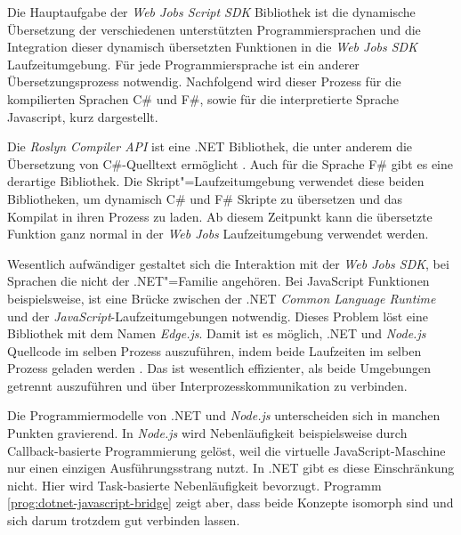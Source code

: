 Die Hauptaufgabe der \textit{Web Jobs Script SDK} Bibliothek ist die dynamische Übersetzung der verschiedenen unterstützten Programmiersprachen und die Integration dieser dynamisch übersetzten Funktionen in die \textit{Web Jobs SDK} Laufzeitumgebung. Für jede Programmiersprache ist ein anderer Übersetzungsprozess notwendig. Nachfolgend wird dieser Prozess für die kompilierten Sprachen C\# und F\#, sowie für die interpretierte Sprache Javascript, kurz dargestellt.

Die \textit{Roslyn Compiler API} ist eine .NET Bibliothek, die unter anderem die Übersetzung von C\#-Quelltext ermöglicht \cite[5]{Roslyn}. Auch für die Sprache F\# gibt es eine derartige Bibliothek. Die Skript"=Laufzeitumgebung verwendet diese beiden Bibliotheken, um dynamisch C\# und F\# Skripte zu übersetzen und das Kompilat in ihren Prozess zu laden. Ab diesem Zeitpunkt kann die übersetzte Funktion ganz normal in der \textit{Web Jobs} Laufzeitumgebung verwendet werden.

Wesentlich aufwändiger gestaltet sich die Interaktion mit der \textit{Web Jobs SDK}, bei Sprachen die nicht der .NET"=Familie angehören. Bei JavaScript Funktionen beispielsweise, ist eine Brücke zwischen der .NET \textit{Common Language Runtime} und der \textit{JavaScript}-Laufzeitumgebungen notwendig. Dieses Problem löst eine Bibliothek mit dem Namen \textit{Edge.js}. Damit ist es möglich, .NET und \textit{Node.js} Quellcode im selben Prozess auszuführen, indem beide Laufzeiten im selben Prozess geladen werden \cite{EdgeJs}. Das ist wesentlich effizienter, als beide Umgebungen getrennt auszuführen und über Interprozesskommunikation zu verbinden.

Die Programmiermodelle von .NET und \textit{Node.js} unterscheiden sich in manchen Punkten gravierend. In \textit{Node.js} wird Nebenläufigkeit beispielsweise durch Callback-basierte Programmierung gelöst, weil die virtuelle JavaScript-Maschine nur einen einzigen Ausführungsstrang nutzt. In .NET gibt es diese Einschränkung nicht. Hier wird Task-basierte Nebenläufigkeit bevorzugt. Programm \ref{prog:dotnet-javascript-bridge} zeigt aber, dass beide Konzepte isomorph sind und sich darum trotzdem gut verbinden lassen.

